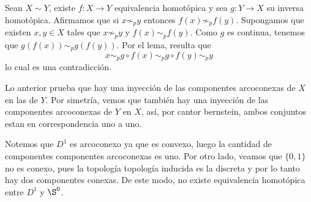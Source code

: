 \documentclass{article}
\begin{document}
\noindent Sean $X\sim Y$, existe $f:X\to Y$ equivalencia homotópica y sea $g:Y\to X$ su inversa 
homotópica. Afirmamos que si $x\not\sim_{p}y$ entonces $f(x)\not\sim_{p}f(y)$. Supongamos que 
existen $x,y\in X$ tales que $x\not\sim_{p}y$ y $f(x)\sim_{p}f(y)$. Como $g$ es continua, tenemos
que $g(f(x))\sim_{p}g(f(y))$. Por el lema, resulta que
\begin{equation*}
    x\sim_{p}g\circ f(x)\sim_{p}g\circ f(y)\sim_{p}y
\end{equation*}
lo cual es una contradicción.

\vspace{2mm}
\noindent Lo anterior prueba que hay una inyección de las componentes arcoconexas de $X$ en las de
$Y$. Por simetría, vemos que también hay una inyección de las componentes arcoconexas de $Y$ en 
$X$, así, por cantor bernstein, ambos conjuntos estan en correspondencia uno a uno.

\vspace{2mm}
\noindent Notemos que $D^{1}$ es arcoconexo ya que es convexo, luego la cantidad de componentes 
componentes arcoconexas es uno. Por otro lado, veamos que $\{0,1\}$ no es conexo, pues la 
topología topología inducida es la discreta y por lo tanto hay dos componentes conexas. De este
modo, no existe equivalencia homotópica entre $D^{1}$ y $\S^{0}$.
\end{document}

